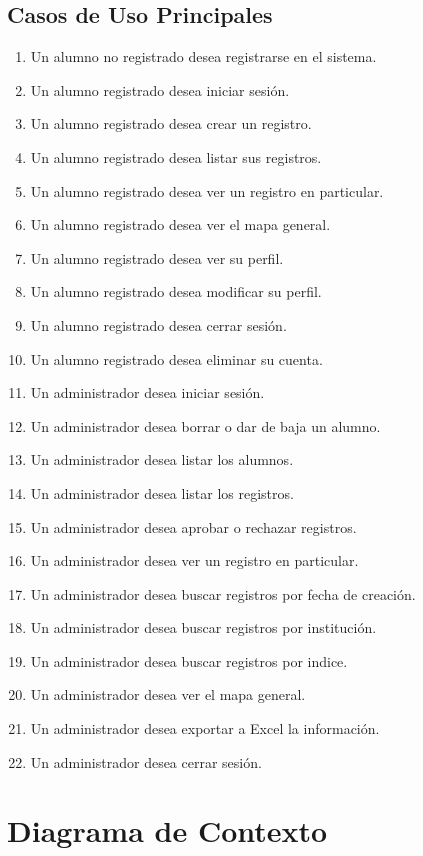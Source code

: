 \subsection{Casos de Uso Principales}

\begin{enumerate}[CU1: ]
    \itemsep-1em
    \item Un alumno no registrado desea registrarse en el sistema.
    \item Un alumno registrado desea iniciar sesión.
    \item Un alumno registrado desea crear un registro.
    \item Un alumno registrado desea listar sus registros.
    \item Un alumno registrado desea ver un registro en particular.
    \item Un alumno registrado desea ver el mapa general.
    \item Un alumno registrado desea ver su perfil.
    \item Un alumno registrado desea modificar su perfil.
    \item Un alumno registrado desea cerrar sesión.
    \item Un alumno registrado desea eliminar su cuenta.
    \item Un administrador desea iniciar sesión.
    \item Un administrador desea borrar o dar de baja un alumno.
    \item Un administrador desea listar los alumnos.
    \item Un administrador desea listar los registros.
    \item Un administrador desea aprobar o rechazar registros.
    \item Un administrador desea ver un registro en particular.
    \item Un administrador desea buscar registros por fecha de creación.
    \item Un administrador desea buscar registros por institución.
    \item Un administrador desea buscar registros por indice.
    \item Un administrador desea ver el mapa general.
    \item Un administrador desea exportar a Excel la información.
    \item Un administrador desea cerrar sesión.
\end{enumerate}

\section{Diagrama de Contexto}

